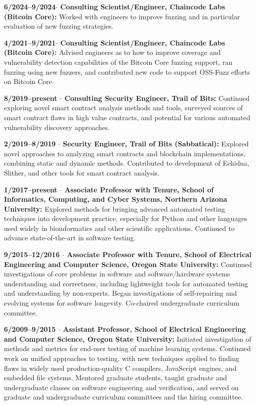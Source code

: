 \documentclass[ComputerScience]{vita}
\begin{document}
\begin{vita}
\begin{Experience}
\item {\bf 6/2024--9/2024$\cdot$ Consulting Scientist/Engineer,
    Chaincode Labs (Bitcoin Core):} Worked with engineers to improve
  fuzzing and in particular evaluation of new fuzzing strategies. 
  
\item {\bf 4/2021--9/2021$\cdot$ Consulting Scientist/Engineer,
    Chaincode Labs (Bitcoin Core):} Advised engineers as to how to
  improve coverage and vulnerability detection capabilities of the
  Bitcoin Core fuzzing support, ran fuzzing using new fuzzers, and
  contributed new code to support OSS-Fuzz efforts on Bitcoin Core. 
  
\item {\bf 8/2019--present $\cdot$ Consulting Security Engineer, Trail of Bits:} Continued exploring novel smart contract analysis methods and tools, surveyed sources of smart contract flaws in high value contracts, and potential for various automated vulnerability discovery approaches. 

\item {\bf 2/2019--8/2019 $\cdot$ Security Engineer, Trail of Bits
    (Sabbatical):} Explored novel approaches to analyzing smart
  contracts and blockchain implementations, combining static and dynamic
  methods.  Contributed to development of Echidna, Slither, and other
  tools for smart contract analysis.

\item {\bf 1/2017--present $\cdot$ Associate Professor with Tenure, School of Informatics, Computing, and Cyber Systems, Northern Arizona University:} Explored methods for bringing advanced automated testing techniques into development practice, especially for Python and other languages used widely in bioinformatics and other scientific applications.  Continued to advance state-of-the-art in software testing.

  \item {\bf 9/2015--12/2016 $\cdot$ Associate Professor with Tenure, School of Electrical Engineering and Computer Science, Oregon State University:} Continued investigations of core problems in software and software/hardware systems understanding and correctness, including lightweight tools for automated testing and understanding by non-experts.  Began investigations of self-repairing and evolving systems for software longevity.  Co-chaired undergraduate curriculum committee.

  \item {\bf 6/2009--9/2015 $\cdot$ Assistant Professor, School of
    Electrical Engineering and Computer Science, Oregon State
    University:} Initiated investigation of methods and metrics for
    end-user testing of machine learning systems.  Continued work
    on unified approaches to testing, with new techniques applied to finding flaws in widely used production-quality C compilers, JavaScript engines, and embedded file systems.  Mentored graduate
    students, taught graduate and undergraduate classes on software
    engineering and verification, and served on graduate and undergraduate curriculum committees and the hiring committee.


\end{Experience}
\end{vita}
\end{document}
